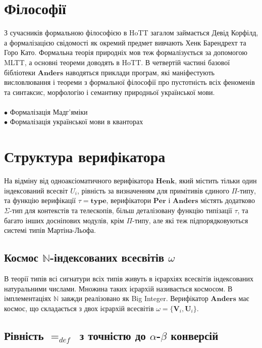 \documentclass{article}
\theoremstyle{definition}
\newcommand*{\nat}{$\mathbb{N}$}
\newcommand*{\defequ}{$=_{def}$}
\begin{document}
\section*{Філософії}

З сучасників формальною філософією в HoTT загалом займається Девід Корфілд,
а формалізацією свідомості як окремий предмет вивчають Хенк Барендрехт та Горо Като.
Формальна теорія природніх мов теж формалізується за допомогою MLTT,
а основні теореми доводять в HoTT. В четвертій частині базової
бібліотеки $\mathbf{Anders}$ наводяться приклади програм, які
маніфестують висловлювання і теореми з формальної філософії про пустотність
всіх феноменів та синтаксис, морфологію і семантику природньої української мови.
\\
\\
\noindent $\bullet$ Формалізація Мадг'яміки \\
$\bullet$ Формалізація української мови в кванторах

\section*{Структура верифікатора}

На відміну від одноаксіоматичного верифікатора $\mathbf{Henk}$,
який містить тільки один індексований всесвіт $U_i$, рівність
за визначенням для примітивів єдиного $\Pi$-типу, та функцію
верифікації $\tau = \mathbf{type}$, верифікатори $\mathbf{Per}$
і $\mathbf{Anders}$ містять додатково $\Sigma$-тип для контекстів
та телескопів, більш деталізовану функцію типізації $\tau$,
та багато інших досніпових модулів, крім $\Pi$-типу, але які
теж підпорядковуються системі типів Мартіна-Льофа.

\subsection*{Космос \nat-індексованих всесвітів $\omega$ }

В теорії типів всі сигнатури всіх типів живуть в ієрархіях
всесвітів індексованих натуральними числами. Множина таких
ієрархій називається космосом. В імплементаціях $\mathbb{N}$
завжди реалізовано як Big Integer. Верифікатор $\mathbf{Anders}$ має
космос, що складається з двох ієрархій всесвітів $\omega = \{ \mathbf{V}_i, \mathbf{U}_i \}$.

\subsection*{Рівність \defequ\ з точністю до $\alpha$-$\beta$ конверсій}
\end{document}
